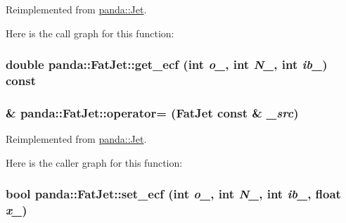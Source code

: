Reimplemented from \hyperlink{classpanda_1_1Jet_a494d27c6c2b773f5849996944cf46eb2}{panda::Jet}.

Here is the call graph for this function:\hypertarget{classpanda_1_1FatJet_ae0171384ac0c2ca7083aae114bf99bf8}{
\subsubsection[{get\_\-ecf}]{\setlength{\rightskip}{0pt plus 5cm}double panda::FatJet::get\_\-ecf (int {\em o\_\-}, \/  int {\em N\_\-}, \/  int {\em ib\_\-}) const}}
\label{classpanda_1_1FatJet_ae0171384ac0c2ca7083aae114bf99bf8}
\hypertarget{classpanda_1_1FatJet_a20e4f6ca23c2a9a603c33e7f023337fe}{
\subsubsection[{operator=}]{ \& panda::FatJet::operator= ({\bf FatJet} const \& {\em \_\-src})}}
\label{classpanda_1_1FatJet_a20e4f6ca23c2a9a603c33e7f023337fe}


Reimplemented from \hyperlink{classpanda_1_1Jet_a06509e069beffe7d5fa12a5450254e6a}{panda::Jet}.

Here is the caller graph for this function:\hypertarget{classpanda_1_1FatJet_a3ec88bad0a620bf747ee3d7a954754a1}{
\subsubsection[{set\_\-ecf}]{\setlength{\rightskip}{0pt plus 5cm}bool panda::FatJet::set\_\-ecf (int {\em o\_\-}, \/  int {\em N\_\-}, \/  int {\em ib\_\-}, \/  float {\em x\_\-})}}
\label{classpanda_1_1FatJet_a3ec88bad0a620bf747ee3d7a954754a1}


